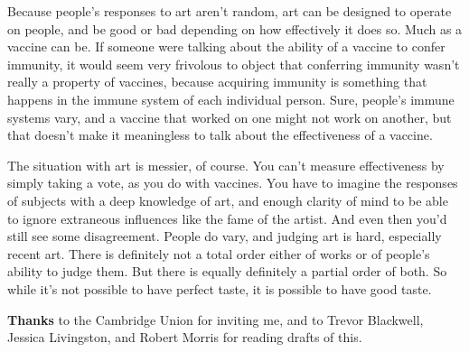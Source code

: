 Because people's responses to art aren't random, art can be designed to
operate on people, and be good or bad depending on how effectively it
does so. Much as a vaccine can be. If someone were talking about the
ability of a vaccine to confer immunity, it would seem very frivolous to
object that conferring immunity wasn't really a property of vaccines,
because acquiring immunity is something that happens in the immune
system of each individual person. Sure, people's immune systems vary,
and a vaccine that worked on one might not work on another, but that
doesn't make it meaningless to talk about the effectiveness of a
vaccine.

The situation with art is messier, of course. You can't measure
effectiveness by simply taking a vote, as you do with vaccines. You have
to imagine the responses of subjects with a deep knowledge of art, and
enough clarity of mind to be able to ignore extraneous influences like
the fame of the artist. And even then you'd still see some disagreement.
People do vary, and judging art is hard, especially recent art. There is
definitely not a total order either of works or of people's ability to
judge them. But there is equally definitely a partial order of both. So
while it's not possible to have perfect taste, it is possible to have
good taste.

\textbf{Thanks} to the Cambridge Union for inviting me, and to Trevor
Blackwell, Jessica Livingston, and Robert Morris for reading drafts of
this.
